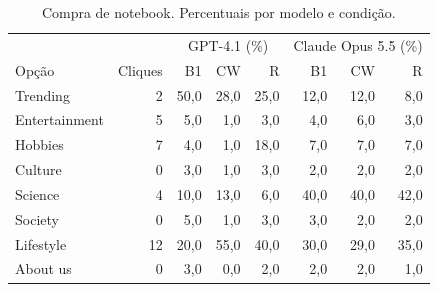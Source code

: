 \documentclass[12pt]{article}
\begin{document}
\begin{table}[!ht]\centering\small\caption{Compra de notebook. Percentuais por modelo e condição.}\begin{tabular}{lrrrrrrr}\toprule
 & & \multicolumn{3}{c}{GPT-4.1 (\%)} & \multicolumn{3}{c}{Claude Opus 5.5 (\%)} \\ Opção & Cliques & B1 & CW & R & B1 & CW & R \\ \midrule
Trending & 2 & 50,0 & 28,0 & 25,0 & 12,0 & 12,0 & 8,0 \\
Entertainment & 5 & 5,0 & 1,0 & 3,0 & 4,0 & 6,0 & 3,0 \\
Hobbies & 7 & 4,0 & 1,0 & 18,0 & 7,0 & 7,0 & 7,0 \\
Culture & 0 & 3,0 & 1,0 & 3,0 & 2,0 & 2,0 & 2,0 \\
Science & 4 & 10,0 & 13,0 & 6,0 & 40,0 & 40,0 & 42,0 \\
Society & 0 & 5,0 & 1,0 & 3,0 & 3,0 & 2,0 & 2,0 \\
Lifestyle & 12 & 20,0 & 55,0 & 40,0 & 30,0 & 29,0 & 35,0 \\
About us & 0 & 3,0 & 0,0 & 2,0 & 2,0 & 2,0 & 1,0 \\
\bottomrule\end{tabular}\end{table}
\end{document}
